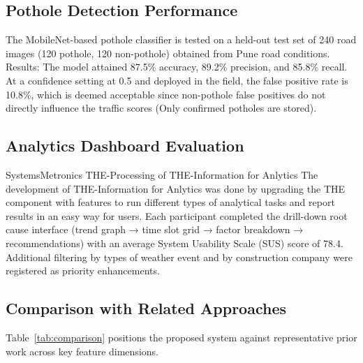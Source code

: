 \documentclass[conference]{IEEEtran}
\begin{document}
\subsection{Pothole Detection Performance}

The MobileNet-based pothole classifier is tested on a held-out test set of 240 road images (120 pothole, 120 non-pothole) obtained from Pune road conditions. Results: The model attained 87.5\% accuracy, 89.2\% precision, and 85.8\% recall. At a confidence setting at 0.5 and deployed in the field, the false positive rate is 10.8\%, which is deemed acceptable since non-pothole false positives do not directly influence the traffic scores (Only confirmed potholes are stored).

\subsection{Analytics Dashboard Evaluation}

SystemsMetronics THE-Processing of THE-Information for Anlytics The development of THE-Information for Anlytics was done by upgrading the THE component with features to run diﬀerent types of analytical tasks and report results in an easy way for users. Each participant completed the drill-down root cause interface (trend graph → time slot grid → factor breakdown → recommendations) with an average System Usability Scale (SUS) score of 78.4. Additional filtering by types of weather event and by construction company were registered as priority enhancements.

\subsection{Comparison with Related Approaches}

Table~\ref{tab:comparison} positions the proposed system against representative prior work across key feature dimensions.
\end{document}
